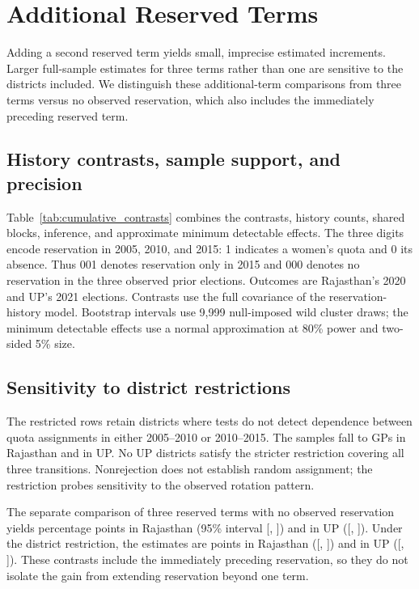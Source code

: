 \clearpage
\section{Additional Reserved Terms}\label{sec:app_additional_terms}
\suppressfloats[t]

Adding a second reserved term yields small, imprecise estimated increments. Larger full-sample estimates for three terms rather than one are sensitive to the districts included. We distinguish these additional-term comparisons from three terms versus no observed reservation, which also includes the immediately preceding reserved term.

\subsection{History contrasts, sample support, and precision}

Table~\ref{tab:cumulative_contrasts} combines the contrasts, history counts, shared blocks, inference, and approximate minimum detectable effects. The three digits encode reservation in 2005, 2010, and 2015: 1 indicates a women's quota and 0 its absence. Thus 001 denotes reservation only in 2015 and 000 denotes no reservation in the three observed prior elections. Outcomes are Rajasthan's 2020 and UP's 2021 elections. Contrasts use the full covariance of the reservation-history model. Bootstrap intervals use 9,999 null-imposed wild cluster draws; the minimum detectable effects use a normal approximation at 80\% power and two-sided 5\% size.


\FloatBarrier

\subsection{Sensitivity to district restrictions}

The restricted rows retain districts where tests do not detect dependence between quota assignments in either 2005--2010 or 2010--2015. The samples fall to \rajRestrictedAlwaysN{} GPs in Rajasthan and \upRestrictedAlwaysN{} in UP. No UP districts satisfy the stricter restriction covering all three transitions. Nonrejection does not establish random assignment; the restriction probes sensitivity to the observed rotation pattern.

The separate comparison of three reserved terms with no observed reservation yields \rajFullAlways{} percentage points in Rajasthan (95\% interval [\rajFullAlwaysLow{}, \rajFullAlwaysHigh{}]) and \upFullAlways{} in UP ([\upFullAlwaysLow{}, \upFullAlwaysHigh{}]). Under the district restriction, the estimates are \rajRestrictedAlways{} points in Rajasthan ([\rajRestrictedAlwaysLow{}, \rajRestrictedAlwaysHigh{}]) and \upRestrictedAlways{} in UP ([\upRestrictedAlwaysLow{}, \upRestrictedAlwaysHigh{}]). These contrasts include the immediately preceding reservation, so they do not isolate the gain from extending reservation beyond one term.

